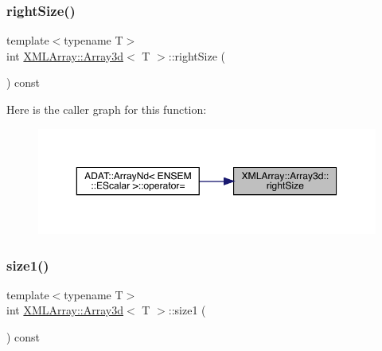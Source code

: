 \mbox{\label{classXMLArray_1_1Array3d_a19c4d18fb2ee0f0ee27631f0aa35ccdc}} 
\subsubsection{\texorpdfstring{rightSize()}{rightSize()}\hspace{0.1cm}{\footnotesize\ttfamily [2/2]}}
{\footnotesize\ttfamily template$<$typename T$>$ \\
int \mbox{\hyperlink{classXMLArray_1_1Array3d}{X\+M\+L\+Array\+::\+Array3d}}$<$ T $>$\+::right\+Size (\begin{DoxyParamCaption}{ }\end{DoxyParamCaption}) const\hspace{0.3cm}{\ttfamily [inline]}}

Here is the caller graph for this function\+:\nopagebreak
\begin{figure}[H]
\begin{center}
\leavevmode
\includegraphics[width=350pt]{db/da0/classXMLArray_1_1Array3d_a19c4d18fb2ee0f0ee27631f0aa35ccdc_icgraph}
\end{center}
\end{figure}
\mbox{\label{classXMLArray_1_1Array3d_aa084cbb2756e62556c9ec4c4cb971bf0}} 
\subsubsection{\texorpdfstring{size1()}{size1()}\hspace{0.1cm}{\footnotesize\ttfamily [1/2]}}
{\footnotesize\ttfamily template$<$typename T$>$ \\
int \mbox{\hyperlink{classXMLArray_1_1Array3d}{X\+M\+L\+Array\+::\+Array3d}}$<$ T $>$\+::size1 (\begin{DoxyParamCaption}{ }\end{DoxyParamCaption}) const\hspace{0.3cm}{\ttfamily [inline]}}



